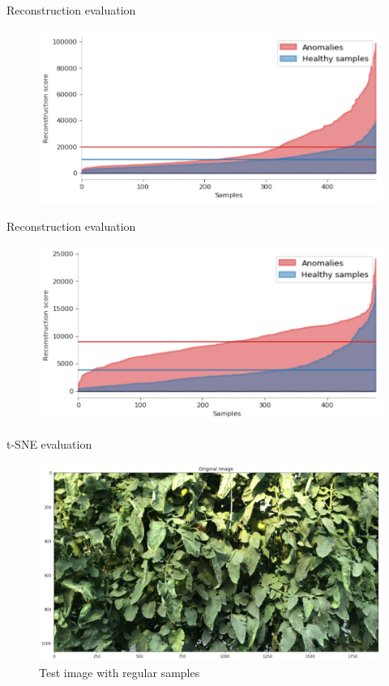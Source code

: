 \documentclass[15pt]{beamer} %
\begin{document}
\begin{frame}{Reconstruction evaluation}
 \begin{figure}
   \centering
   \includegraphics[width=.85\textwidth]{rec_svae_eval}
  \end{figure}
\end{frame}

\begin{frame}{Reconstruction evaluation}
 \begin{figure}
   \centering
   \includegraphics[width=.85\textwidth]{rec_anogan_eval}
  \end{figure}
\end{frame}

\begin{frame}{t-SNE evaluation}
 \begin{figure}
  \centering
  \includegraphics[width=.85\textwidth]{anogan_test_image1}
  \caption{Test image with regular samples}
 \end{figure}
\end{frame}
\end{document}
